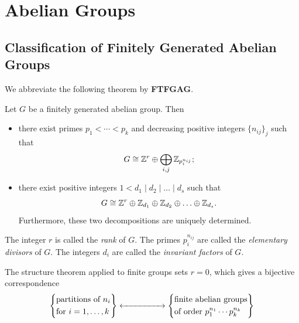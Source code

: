 \chapter{Abelian Groups}
\section{Classification of Finitely Generated Abelian Groups}

We abbreviate the following theorem by \textbf{FTFGAG}. 
\begin{theorem}
  Let \(G\) be a finitely generated abelian group. Then \begin{itemize}
    \item there exist primes \(p_1 < \cdots < p_k\) and decreasing positive integers \(\{n_{ij}\}_j\) such that \[
      G \cong \mathbb{Z}^r \oplus \bigoplus_{i,j}\mathbb{Z}_{p_i^{\smash[b]{n_{ij}}}};
    \]
    \item there exist positive integers \(1 < d_1 \mid d_2 \mid \ldots \mid d_s\) such that \[
      G \cong \mathbb{Z}^r \oplus \mathbb{Z}_{d_1} \oplus \mathbb{Z}_{d_2} \oplus \ldots \oplus \mathbb{Z}_{d_s}.
    \]
    Furthermore, these two decompositions are uniquely determined.
  \end{itemize}
\end{theorem}

The integer \(r\) is called the \emph{rank} of \(G\). The primes \(p_i^{n_{ij}}\) are called the \emph{elementary divisors} of \(G\). The integers \(d_i\) are called the \emph{invariant factors} of \(G\).

The structure theorem applied to finite groups sets \(r = 0\), which gives a bijective correspondence \begin{align*}
  \left\{
    \begin{aligned}
        &\text{partitions of \(n_i\)} \\
        &\text{for \(i = 1,\ldots,k\)}
    \end{aligned}\right\}
    \xleftrightarrow{\hspace*{5em}}
  \left\{
    \begin{aligned}
        &\text{finite abelian groups} \\
        &\text{of order \(p_1^{n_1}\cdots p_k^{n_k}\)} \\
  \end{aligned}\right\}
\end{align*}

